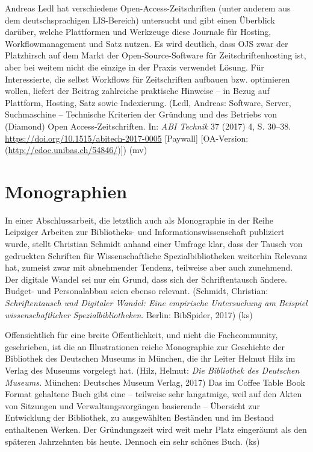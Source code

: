 \documentclass[a4paper,
fontsize=11pt,
oneside,
numbers=noperiodatend,
parskip=half-,
bibliography=totoc,
final
]{scrartcl}
\begin{document}
Andreas Ledl hat verschiedene Open-Access-Zeitschriften (unter anderem
aus dem deutschsprachigen LIS-Bereich) untersucht und gibt einen
Überblick darüber, welche Plattformen und Werkzeuge diese Journale für
Hosting, Workflowmanagement und Satz nutzen. Es wird deutlich, dass OJS
zwar der Platzhirsch auf dem Markt der Open-Source-Software für
Zeitschriftenhosting ist, aber bei weitem nicht die einzige in der
Praxis verwendet Lösung. Für Interessierte, die selbst Workflows für
Zeitschriften aufbauen bzw. optimieren wollen, liefert der Beitrag
zahlreiche praktische Hinweise -- in Bezug auf Plattform, Hosting, Satz
sowie Indexierung. (Ledl, Andreas: Software, Server, Suchmaschine --
Technische Kriterien der Gründung und des Betriebs von (Diamond) Open
Access-Zeitschriften. In: \emph{ABI Technik} 37 (2017) 4, S. 30--38.
\url{https://doi.org/10.1515/abitech-2017-0005} {[}Paywall{]}
{[}OA-Version: (\url{http://edoc.unibas.ch/54846/}){]}) (mv)

\hypertarget{monographien}{%
\section*{Monographien}\label{monographien}}

In einer Abschlussarbeit, die letztlich auch als Monographie in der
Reihe Leipziger Arbeiten zur Bibliotheks- und Informationswissenschaft
publiziert wurde, stellt Christian Schmidt anhand einer Umfrage klar,
dass der Tausch von gedruckten Schriften für Wissenschaftliche
Spezialbibliotheken weiterhin Relevanz hat, zumeist zwar mit abnehmender
Tendenz, teilweise aber auch zunehmend. Der digitale Wandel sei nur ein
Grund, dass sich der Schriftentausch ändere. Budget- und Personalabbau
seien ebenso relevant. (Schmidt, Christian: \emph{Schriftentausch und
Digitaler Wandel: Eine empirische Untersuchung am Beispiel
wissenschaftlicher Spezialbibliotheken}. Berlin: BibSpider, 2017) (ks)

Offensichtlich für eine breite Öffentlichkeit, und nicht die
Fachcommunity, geschrieben, ist die an Illustrationen reiche Monographie
zur Geschichte der Bibliothek des Deutschen Museums in München, die ihr
Leiter Helmut Hilz im Verlag des Museums vorgelegt hat. (Hilz, Helmut:
\emph{Die Bibliothek des Deutschen Museums.} München: Deutsches Museum
Verlag, 2017) Das im Coffee Table Book Format gehaltene Buch gibt eine
-- teilweise sehr langatmige, weil auf den Akten von Sitzungen und
Verwaltungsvorgängen basierende -- Übersicht zur Entwicklung der
Bibliothek, zu ausgewählten Beständen und im Bestand enthaltenen Werken.
Der Gründungszeit wird weit mehr Platz eingeräumt als den späteren
Jahrzehnten bis heute. Dennoch ein sehr schönes Buch. (ks)
\end{document}
